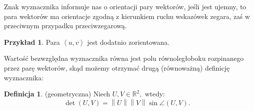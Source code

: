 \documentclass[12pt,a4paper]{article}
\newcommand{\norm}[1]{\left\lVert#1\right\rVert}
\newcommand{\RR}{\mathbb{R}}
\newcommand{\Pair}[2]{\left<#1,#2\right>}
\theoremstyle{theorem}
\theoremstyle{theorem}
\theoremstyle{definition}
\newtheorem{df}{Definicja}[section]
\theoremstyle{definition}
\theoremstyle{proof}
\theoremstyle{definition}
\newtheorem*{prz}{Przykład}
\begin{document}
Znak wyznacznika informuje nas o orientacji pary wektorów, jeśli jest ujemny, to para wektorów ma orientacje zgodną z kierunkiem ruchu wskazówek zegara, zaś w przeciwnym przypadku przeciwzegarową.
\begin{center}
\end{center}
\begin{prz}
  Para $\Pair{u}{v}$ jest dodatnio zorientowana.
\end{prz}

Wartość bezwzględna wyznacznika równa jest polu równoległoboku rozpinanego przez parę wektorów, skąd możemy otrzymać drugą (równoważną) definicję wyznacznika:
\begin{df}(geometryczna) Niech $U,V\in\RR^2,$ wtedy: $$\det(U,V) = \norm{U}\norm{V}\sin\angle(U,V).$$ \end{df}
\end{document}
